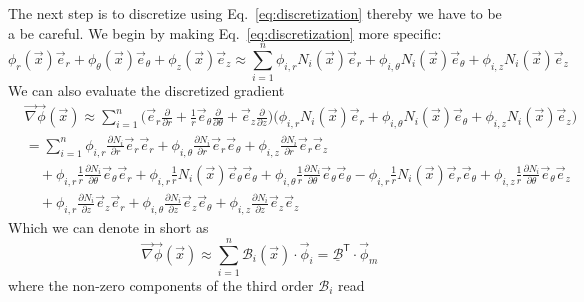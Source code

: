 \documentclass[times,namecite]{goose-article}
\begin{document}
The next step is to discretize using Eq.~\eqref{eq:discretization} thereby we have to be a be careful. We begin by making Eq.~\eqref{eq:discretization} more specific:
\begin{equation}
  \phi_r (\vec{x}) \vec{e}_r + \phi_\theta (\vec{x}) \vec{e}_\theta + \phi_z (\vec{x}) \vec{e}_z
  \approx
  \sum\limits_{i=1}^{n}
  \phi_{i,r} N_i (\vec{x}) \vec{e}_r +
  \phi_{i,\theta}  N_i (\vec{x}) \vec{e}_\theta +
  \phi_{i,z}  N_i (\vec{x}) \vec{e}_z
\end{equation}
We can also evaluate the discretized gradient
\begin{align}
  &\vec{\nabla} \vec{\phi} (\vec{x})
  \approx
  \sum\limits_{i=1}^{n}
  \bigg(
  \vec{e}_r \frac{\partial}{\partial r} +
  \frac{1}{r} \vec{e}_\theta \frac{\partial}{\partial \theta} +
  \vec{e}_z \frac{\partial}{\partial z}
  \bigg)
  \bigg(
  \phi_{i,r} N_i (\vec{x}) \vec{e}_r +
  \phi_{i,\theta}  N_i (\vec{x}) \vec{e}_\theta +
  \phi_{i,z}  N_i (\vec{x}) \vec{e}_z
  \bigg)
  \\
  &=
  \sum\limits_{i=1}^{n}
    \phi_{i,r     } \frac{\partial N_i}{\partial r} \vec{e}_r \vec{e}_r
  + \phi_{i,\theta} \frac{\partial N_i}{\partial r} \vec{e}_r \vec{e}_\theta
  + \phi_{i,z     } \frac{\partial N_i}{\partial r} \vec{e}_r \vec{e}_z
  \nonumber
  \\
  &\quad
  + \phi_{i,r     } \frac{1}{r} \frac{\partial N_i }{\partial \theta} \vec{e}_\theta \vec{e}_r
  + \phi_{i,r     } \frac{1}{r} N_i (\vec{x}) \vec{e}_\theta \vec{e}_\theta
  + \phi_{i,\theta} \frac{1}{r} \frac{\partial N_i }{\partial \theta} \vec{e}_\theta \vec{e}_\theta
  - \phi_{i,r} \frac{1}{r} N_i (\vec{x}) \vec{e}_r \vec{e}_\theta
  + \phi_{i,z     } \frac{1}{r} \frac{\partial N_i }{\partial \theta} \vec{e}_\theta \vec{e}_z
  \nonumber
  \\
  &\quad
  + \phi_{i,r     } \frac{\partial N_i }{\partial z} \vec{e}_z \vec{e}_r
  + \phi_{i,\theta} \frac{\partial N_i }{\partial z} \vec{e}_z \vec{e}_\theta
  + \phi_{i,z     } \frac{\partial N_i }{\partial z} \vec{e}_z \vec{e}_z
\end{align}
Which we can denote in short as
\begin{equation}
  \vec{\nabla} \vec{\phi} (\vec{x})
  \approx
  \sum\limits_{i=1}^{n}
  \mathcal{B}_i (\vec{x}) \cdot \vec{\phi}_i
  =
  \underline{\mathcal{B}}^\mathsf{T} \cdot \vec{\phi}_m
\end{equation}
where the non-zero components of the third order $\mathcal{B}_i$ read
\end{document}
